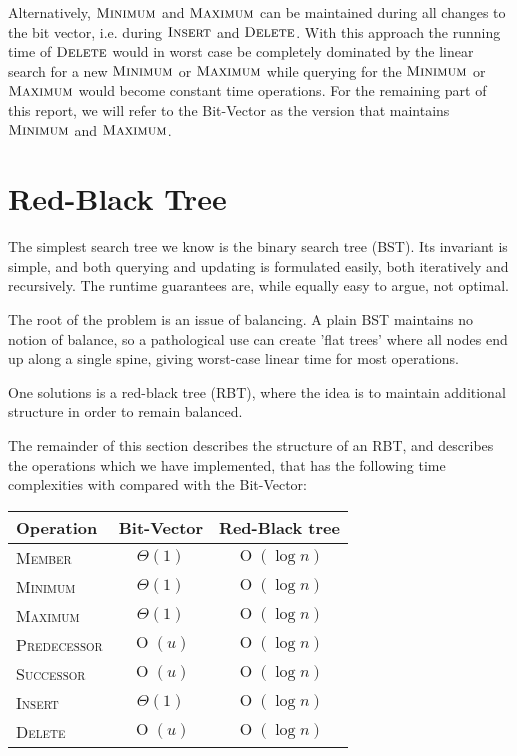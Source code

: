 \documentclass[oneside,11pt,openright]{report}
\newcommand{\BigO}[1]{\ensuremath{\operatorname{O}\left(#1\right)}}
\newcommand{\BigT}[1]{\ensuremath{\Theta\left(#1\right)}}
\newcommand{\Insert}{\textsc{Insert}}
\newcommand{\Delete}{\textsc{Delete}}
\newcommand{\Member}{\textsc{Member}}
\newcommand{\Minimum}{\textsc{Minimum}}
\newcommand{\Maximum}{\textsc{Maximum}}
\newcommand{\Predecessor}{\textsc{Predecessor}}
\newcommand{\Successor}{\textsc{Successor}}
\begin{document}
Alternatively, $\Minimum$ and $\Maximum$ can be maintained during all
changes to the bit vector, i.e. during $\Insert$ and $\Delete$. With this
approach the running time of $\Delete$ would in worst case be completely
dominated by the linear search for a new $\Minimum$ or $\Maximum$ while
querying for the $\Minimum$ or $\Maximum$ would become constant time
operations. For the remaining part of this report, we will refer to the Bit-Vector as the version that maintains $\Minimum$ and $\Maximum$.

\chapter{Red-Black Tree}

The simplest search tree we know is the binary search tree (BST). Its
invariant is simple, and both querying and updating is formulated
easily, both iteratively and recursively. The runtime guarantees are,
while equally easy to argue, not optimal.

The root of the problem is an issue of balancing. A plain BST
maintains no notion of balance, so a pathological use can create 'flat
trees' where all nodes end up along a single spine, giving worst-case
linear time for most operations.

One solutions is a red-black tree (RBT), where the idea is to maintain
additional structure in order to remain balanced.

The remainder of this section describes the structure of an RBT, and
describes the operations which we have implemented, that has the following time complexities with compared with the Bit-Vector:

\begin{center}
  \begin{tabular}{ l | c | c}
    Operation & Bit-Vector & Red-Black tree \\ \hline
    \Member & $\BigT{1}$ & $\BigO{\log n}$ \\ 
    \Minimum & $\BigT{1}$ & $\BigO{\log n}$ \\ 
    \Maximum & $\BigT{1}$ & $\BigO{\log n}$ \\ 
    \Predecessor & $\BigO{u}$ & $\BigO{\log n}$ \\ 
    \Successor & $\BigO{u}$ & $\BigO{\log n}$ \\ 
    \Insert & $\BigT{1}$ & $\BigO{\log n}$ \\ 
    \Delete & $\BigO{u}$ & $\BigO{\log n}$ \\
  \end{tabular}
\end{center}
\end{document}
